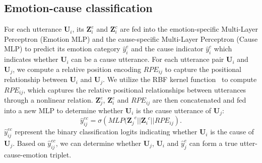 \documentclass[11pt]{article}
\begin{document}
\subsection{Emotion-cause classification}
For each utterance $\bm{U}_i$, its $\bm{Z}_i^e$ and $\bm{Z}_i^c$ are fed into the emotion-specific Multi-Layer Perceptron (Emotion MLP) and the cause-specific Multi-Layer Perceptron (Cause MLP) to predict its emotion category $\hat{y}_i^e$ and the cause indicator $\hat{y}_i^c$ which indicates whether $\bm{U}_i$ can be a cause utterance.
For each utterance pair $\bm{U}_i$ and $\bm{U}_j$, we compute a relative position encoding $RPE_{ij}$ to capture the positional relationship between $\bm{U}_i$ and $\bm{U}_j$.
We utilize the RBF kernel function~\cite{wei2020effective} to compute $RPE_{ij}$, which captures the relative positional relationships between utterances through a nonlinear relation.
$\bm{Z}_j^e$, $\bm{Z}_i^c$ and $RPE_{ij}$ are then concatenated and fed into a new MLP to determine whether $\bm{U}_i$ is the cause utterance of $\bm{U}_j$:
\begin{equation}
    {\hat{y}}_{ij}^{ec}=\sigma(MLP{(\bm{Z}_j}^e||{\bm{Z}_i}^c||RPE_{ij}).
\end{equation}
${\hat{y}}_{ij}^{ec}$ represent the binary classification logits indicating whether $\bm{U}_i$ is the cause of $\bm{U}_j$.
Based on ${\hat{y}}_{ij}^{ec}$, we can determine whether $\bm{U}_j$, $\bm{U}_i$ and $\hat{y}_j^e$ can form a true utter-cause-emotion triplet.
\renewcommand{\arraystretch}{0.8}
\end{document}
